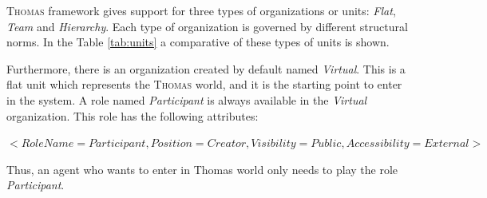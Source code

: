 \textsc{Thomas} framework gives support for three types of organizations or units: \textit{Flat}, \textit{Team} and \textit{Hierarchy}. Each type of organization is governed by different structural norms. In the Table \ref{tab:units} a comparative of these types of units is shown.

Furthermore, there is an organization created by default named \textit{Virtual}. This is a flat unit which represents the \textsc{Thomas} world, and it is the starting point to enter in the system. A role named \textit{Participant} is always available in the \textit{Virtual} organization. This role has the following attributes:

 $<RoleName = Participant, Position = Creator, Visibility = Public, Accessibility = External>$

Thus, an agent who wants to enter in Thomas world only needs to play the role \textit{Participant}.




